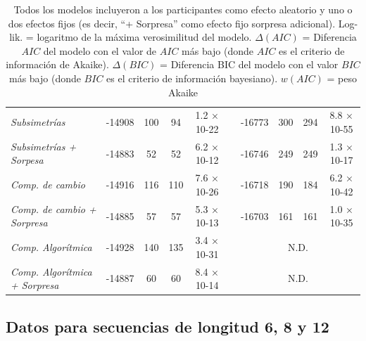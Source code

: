\begin{table}[]
{\begin{tabular}{lccccccccc}
\textit{Subsimetrías}         & -14908        & 100        & 94        & 1.2 × 10-22    &                & -16773        & 300         & 294        & 8.8 × 10-55    \\
\textit{Subsimetrías + Sorpesa}    & -14883        & 52         & 52        & 6.2 × 10-12    &                & -16746        & 249         & 249        & 1.3 × 10-17    \\
\textit{Comp. de cambio}       & -14916        & 116        & 110        & 7.6 × 10-26    &                & -16718        & 190         & 184        & 6.2 × 10-42    \\
\textit{Comp. de cambio + Sorpresa}  & -14885        & 57         & 57        & 5.3 × 10-13    &                & -16703        & 161         & 161        & 1.0 × 10-35    \\
\textit{Comp. Algorítmica}      & -14928        & 140        & 135        & 3.4 × 10-31    &                & \multicolumn{4}{c}{N.D.}                               \\
\textit{Comp. Algorítmica + Sorpresa} & -14887        & 60         & 60        & 8.4 × 10-14    &                & \multicolumn{4}{c}{N.D.}                               \\ \hline
\end{tabular}}

\caption{Todos los modelos incluyeron a los participantes como efecto aleatorio y uno o dos efectos fijos (es decir, ``+ Sorpresa'' como efecto fijo sorpresa adicional). Log-lik. = logaritmo de la máxima verosimilitud del modelo. $\Delta (AIC)$ = Diferencia $AIC$ del modelo con el valor de $AIC$ más bajo (donde $AIC$ es el criterio de información de Akaike). $\Delta (BIC)$ = Diferencia BIC del modelo con el valor $BIC$ más bajo (donde $BIC$ es el criterio de información bayesiano). $w(AIC)$ = peso Akaike}
\label{PlosBIO-T2}
\end{table}


\subsection{Datos para secuencias de longitud 6, 8 y 12}

